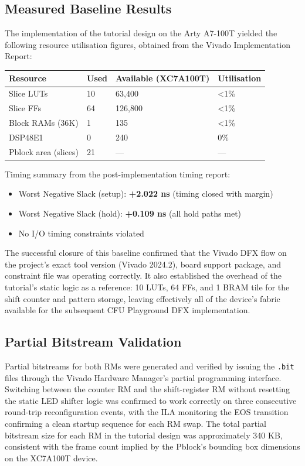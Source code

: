 \subsection{Measured Baseline Results}

The implementation of the tutorial design on the Arty A7-100T yielded the following resource utilisation figures, obtained from the Vivado Implementation Report:

\begin{table}[htbp]
\centering
\begin{tabular}{llll}
\toprule
Resource & Used & Available (XC7A100T) & Utilisation \\
\midrule
Slice LUTs & 10 & 63,400 & \textless{}1\% \\
Slice FFs & 64 & 126,800 & \textless{}1\% \\
Block RAMs (36K) & 1 & 135 & \textless{}1\% \\
DSP48E1 & 0 & 240 & 0\% \\
Pblock area (slices) & 21 & — & — \\
\bottomrule
\end{tabular}
\end{table}

Timing summary from the post-implementation timing report:

\begin{itemize}
  \item Worst Negative Slack (setup): \textbf{+2.022 ns} (timing closed with margin)
  \item Worst Negative Slack (hold): \textbf{+0.109 ns} (all hold paths met)
  \item No I/O timing constraints violated
\end{itemize}
The successful closure of this baseline confirmed that the Vivado DFX flow on the project's exact tool version (Vivado 2024.2), board support package, and constraint file was operating correctly. It also established the overhead of the tutorial's static logic as a reference: 10 LUTs, 64 FFs, and 1 BRAM tile for the shift counter and pattern storage, leaving effectively all of the device's fabric available for the subsequent CFU Playground DFX implementation.

\subsection{Partial Bitstream Validation}

Partial bitstreams for both RMs were generated and verified by issuing the \texttt{.bit} files through the Vivado Hardware Manager's partial programming interface. Switching between the counter RM and the shift-register RM without resetting the static LED shifter logic was confirmed to work correctly on three consecutive round-trip reconfiguration events, with the ILA monitoring the EOS transition confirming a clean startup sequence for each RM swap. The total partial bitstream size for each RM in the tutorial design was approximately 340 KB, consistent with the frame count implied by the Pblock's bounding box dimensions on the XC7A100T device.

